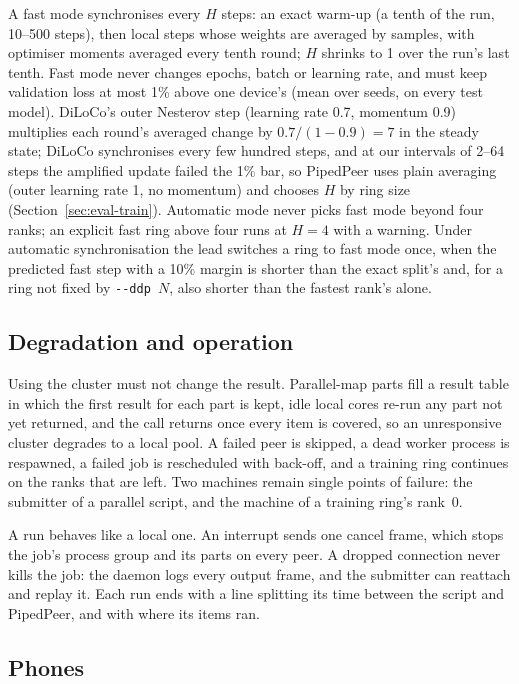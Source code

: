 \documentclass[5p,times,twocolumn]{elsarticle}
\begin{document}
A fast mode synchronises every $H$ steps: an exact warm-up (a tenth of the
run, 10--500 steps), then local steps whose weights are averaged by samples,
with optimiser moments averaged every tenth round; $H$ shrinks to 1 over the
run's last tenth. Fast mode never changes epochs, batch or learning rate, and
must keep validation loss at most 1\% above one device's (mean over seeds, on
every test model). DiLoCo's outer Nesterov step (learning rate 0.7, momentum
0.9) multiplies each round's averaged change by $0.7/(1-0.9)=7$ in the steady
state; DiLoCo synchronises every few hundred steps, and at our intervals of
2--64 steps the amplified update failed the 1\% bar, so PipedPeer uses plain
averaging (outer learning rate 1, no momentum) and chooses $H$ by ring size
(Section~\ref{sec:eval-train}). Automatic mode never picks fast mode beyond
four ranks; an explicit fast ring above four runs at $H=4$ with a warning.
Under automatic synchronisation the lead switches a ring to fast mode once,
when the predicted fast step with a 10\% margin is shorter than the exact
split's and, for a ring not fixed by \texttt{-{}-ddp~$N$}, also shorter than
the fastest rank's alone.

\subsection{Degradation and operation}
\label{sec:ft}

Using the cluster must not change the result. Parallel-map parts fill a result
table in which the first result for each part is kept, idle local cores re-run
any part not yet returned, and the call returns once every item is covered, so
an unresponsive cluster degrades to a local pool. A failed peer is skipped, a
dead worker process is respawned, a failed job is rescheduled with back-off,
and a training ring continues on the ranks that are left. Two machines remain
single points of failure: the submitter of a parallel script, and the machine
of a training ring's rank~0.

A run behaves like a local one. An interrupt sends one cancel frame, which
stops the job's process group and its parts on every peer. A dropped
connection never kills the job: the daemon logs every output frame, and the
submitter can reattach and replay it. Each run ends with a line splitting its
time between the script and PipedPeer, and with where its items ran.

\subsection{Phones}
\label{sec:phone}
\end{document}
